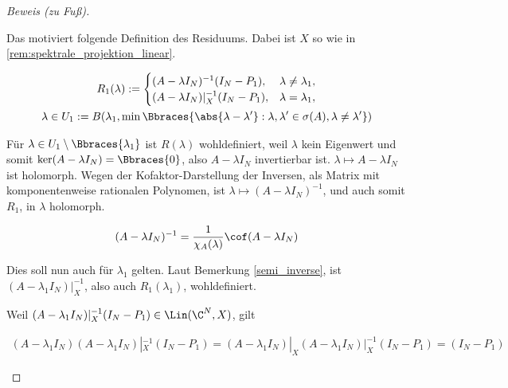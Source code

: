 \begin{proof}[Beweis (zu Fuß)]
\begin{enumerate}[label = (\roman*)]
        Das motiviert folgende Definition des Residuums.
        Dabei ist $X$ so wie in \ref{rem:spektrale_projektion_linear}.

        \begin{multline*}
            R_1(\lambda)
            :=
            \begin{cases}
                (A - \lambda I_N)    ^{-1} (I_N - P_1), & \lambda \neq \lambda_1, \\
                (A - \lambda I_N) |_X^{-1} (I_N - P_1), & \lambda =    \lambda_1, \\
            \end{cases} \\
            \lambda
            \in
            U_1
            :=
            B
            (
                \lambda_1,
                \min
                \Bbraces
                {
                    \abs{\lambda - \lambda^\prime}:
                    \lambda, \lambda^\prime \in \sigma(A),
                    \lambda \neq \lambda^\prime
                }
            )
        \end{multline*}

        Für $\lambda \in U_1 \setminus \Bbraces{\lambda_1}$ ist $R(\lambda)$ wohldefiniert, weil $\lambda$ kein Eigenwert und somit $\ker (A - \lambda I_N) = \Bbraces{0}$, also $A - \lambda I_N$ invertierbar ist.
        $\lambda \mapsto A - \lambda I_N$ ist holomorph.
        Wegen der Kofaktor-Darstellung der Inversen, als Matrix mit komponentenweise rationalen Polynomen, ist $\lambda \mapsto (A - \lambda I_N)^{-1}$, und auch somit $R_1$, in $\lambda$ holomorph.

        \begin{align*}
            (A - \lambda I_N)^{-1}
            =
            \frac{1}{\chi_A(\lambda)}
            \cof (A - \lambda I_N)
        \end{align*}

        Dies soll nun auch für $\lambda_1$ gelten.
        Laut Bemerkung \ref{semi_inverse}, ist $(A - \lambda_1 I_N) |_X^{-1}$, also auch $R_1(\lambda_1)$, wohldefiniert.

        Weil $(A - \lambda_1 I_N) |_X^{-1} (I_N - P_1) \in \Lin(\C^N, X)$, gilt

        \begin{align*}
            (A - \lambda_1 I_N)
            (A - \lambda_1 I_N) |_X^{-1}
            (I_N - P_1)
            =
            (A - \lambda_1 I_N) |_X
            (A - \lambda_1 I_N) |_X^{-1}
            (I_N - P_1)
            =
            (I_N - P_1)
        \end{align*}


\end{enumerate}
\end{proof}
